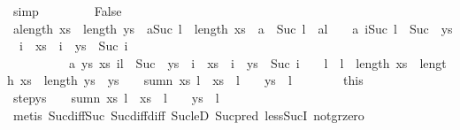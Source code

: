\begin{isabellebody}
\ simp\isanewline
\ \ \isamarkupfalse%
\isanewline
\ \ \ \ \isamarkupfalse%
\ False\isanewline
\ \ \ \ \isamarkupfalse%
\ a{}{\isacharcolon}{\isachardoublequoteopen}length\ xs\ {\isacharequal}\ length\ ys{\isachardoublequoteclose}\ \ a{}{\isacharcolon}{\isachardoublequoteopen}Suc\ l\ {\isasymle}\ length\ xs{\isachardoublequoteclose}\ \ a{}{\isacharcolon}{\isachardoublequoteopen}{}\ {\isacharless}\ Suc\ l{\isachardoublequoteclose}\ \ a{}{\isacharcolon}{\isachardoublequoteopen}l\ {\isasymnoteq}\ {}{\isachardoublequoteclose}\ \ a{}{\isacharcolon}{\isachardoublequoteopen}\ {\isasymforall}i{\isacharless}Suc\ l\ {\isacharminus}\ Suc\ {}{\isachardot}\ ys\ {\isacharbang}\ i\ {\isacharplus}\ xs\ {\isacharbang}\ i\ {\isacharequal}\ ys\ {\isacharbang}\ Suc\ i{\isachardoublequoteclose}\ \isanewline
\ \ \ \ \ \ \ \ \ \ a{}{\isacharcolon}\ {\isachardoublequoteopen}{\isacharparenleft}{\isasymAnd}ys\ xs{\isachardot}\ {\isasymforall}i{\isacharless}l\ {\isacharminus}\ Suc\ {}{\isachardot}\ ys\ {\isacharbang}\ i\ {\isacharplus}\ xs\ {\isacharbang}\ i\ {\isacharequal}\ ys\ {\isacharbang}\ Suc\ i\ {\isasymLongrightarrow}\ {}\ {\isacharless}\ l\ {\isasymLongrightarrow}\ l\ {\isasymle}\ length\ xs\ {\isasymLongrightarrow}\ length\ xs\ {\isacharequal}\ length\ ys\ {\isasymLongrightarrow}\ ys\ {\isacharbang}\ {}\ {\isacharplus}\ sumn\ xs\ l\ {\isacharequal}\ xs\ {\isacharbang}\ {\isacharparenleft}l\ {\isacharminus}\ {}{\isacharparenright}\ {\isacharplus}\ ys\ {\isacharbang}\ {\isacharparenleft}l\ {\isacharminus}\ {}{\isacharparenright}{\isacharparenright}{\isachardoublequoteclose}\isanewline
\ \ \ \ \isamarkupfalse%
\ this\ \isamarkupfalse%
\ step{}{\isacharcolon}{\isachardoublequoteopen}ys\ {\isacharbang}\ {}\ {\isacharplus}\ sumn\ xs\ l\ {\isacharequal}\ xs\ {\isacharbang}\ {\isacharparenleft}l\ {\isacharminus}\ {}{\isacharparenright}\ {\isacharplus}\ ys\ {\isacharbang}\ {\isacharparenleft}l\ {\isacharminus}\ {}{\isacharparenright}{\isachardoublequoteclose}\isanewline
\ \ \ \ \ \ \isamarkupfalse%
\ {\isacharparenleft}metis\ Suc{\isacharunderscore}diff{\isacharunderscore}Suc\ Suc{\isacharunderscore}diff{\isacharunderscore}diff\ Suc{\isacharunderscore}leD\ Suc{\isacharunderscore}pred\ less{\isacharunderscore}SucI\ not{\isacharunderscore}gr{\isacharunderscore}zero{\isacharparenright}\isanewline

\end{isabellebody}
